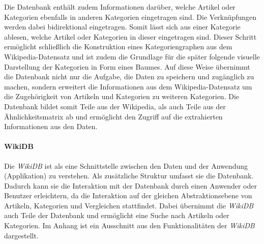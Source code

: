 Die Datenbank enthält zudem Informationen darüber, welche Artikel oder Kategorien ebenfalls in anderen Kategorien eingetragen sind.
Die Verknüpfungen werden dabei bidirektional eingetragen. Somit lässt sich aus einer Kategorie ablesen, welche Artikel oder Kategorien in dieser eingetragen sind.
Dieser Schritt ermöglicht schließlich die Konstruktion eines Kategoriengraphen aus dem Wikipedia-Datensatz und ist zudem die Grundlage für die später folgende visuelle Darstellung der Kategorien in Form eines Baumes.
Auf diese Weise übernimmt die Datenbank nicht nur die Aufgabe, die Daten zu speichern und zugänglich zu machen, sondern erweitert die Informationen aus dem Wikipedia-Datensatz um die Zugehörigkeit von Artikeln und Kategorien zu weiteren Kategorien.
Die Datenbank bildet somit Teile aus der Wikipedia, als auch Teile aus der Ähnlichkeitsmatrix ab und ermöglicht den Zugriff auf die extrahierten Informationen aus den Daten.

\paragraph{WikiDB}
Die \emph{WikiDB} ist als eine Schnittstelle zwischen den Daten und der Anwendung (Applikation) zu verstehen. 
Als zusätzliche Struktur umfasst sie die Datenbank. 
Dadurch kann sie die Interaktion mit der Datenbank durch einen Anwender oder Benutzer erleichtern, da die Interaktion auf der gleichen Abstraktionsebene von Artikeln, Kategorien und Vergleichen stattfindet. 
Dabei übernimmt die \emph{WikiDB} auch Teile der Datenbank und ermöglicht eine Suche nach Artikeln oder Kategorien.
Im Anhang ist ein Ausschnitt aus den Funktionalitäten der \emph{WikiDB} dargestellt. 

